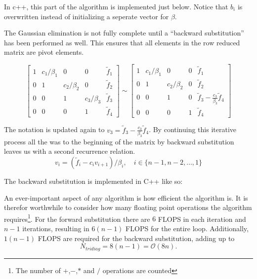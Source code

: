 \documentclass[10pt, a4paper]{amsart}
\begin{document}
In c++, this part of the algorithm is implemented just below. Notice
that $b_i$ is overwritten instead of initializing a seperate vector
for $\beta$. 


The Gaussian elimination is not fully complete until a ``backward
substitution'' has been performed as well. This ensures that all
elements in the row reduced matrix are pivot elements. 

\begin{equation}
\left[
\begin{array}{cccc|c}
1 & c_1/\beta_1 & 0 & 0 & \tilde{f}_1 \\
0 & 1 & c_2/\beta_2 & 0  & \tilde{f}_2 \\
0 & 0 & 1 & c_3/\beta_3 & \tilde{f}_3 \\
0 & 0 & 0 & 1 & \tilde{f}_4
\end{array}
\right] \sim
\left[
\begin{array}{cccc|c}
1 & c_1/\beta_1 & 0 & 0 & \tilde{f}_1 \\
0 & 1 & c_2/\beta_2 & 0  & \tilde{f}_2 \\
0 & 0 & 1 & 0 & \tilde{f}_3 -\frac{c_3}{\beta_3}\tilde{f}_4 \\
0 & 0 & 0 & 1 & \tilde{f}_4
\end{array}
\right]
\end{equation}

The notation is updated again to $v_3 =\tilde{f}_3 -
\frac{c_3}{\beta_3}\tilde{f}_4$. By continuing this iterative process
all the was to the beginning of the matrix by backward substitution
leaves us with a second recurrence relation.
\begin{equation}
\label{eq:backward1}
v_i=(\tilde{f}_i - c_iv_{i+1})/\beta_i, \quad i \in \{n-1,n-2,\dots,1\}
\end{equation}

The backward substitution is implemented in C++ like so:


An ever-important aspect of any algorithm is how efficient the algorithm is. It
is therefor worthwhile to consider how many floating point operations
the algorithm requires\footnote{The number of $+$,$-$,$*$ and $/$
  operations are counted}. For the forward substitution there are $6$
FLOPS in each iteration and $n-1$ iterations, resulting in $6(n-1)$
FLOPS for the entire loop. Additionally, $1(n-1)$ FLOPS are required
for the backward substitution, adding up to 
\begin{equation}
N_{tridiag}=8(n-1)=\mathcal{O} (8n).
\end{equation}
\end{document}
